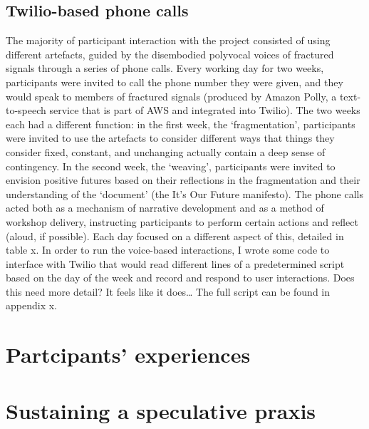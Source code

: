 \subsection{Twilio-based phone calls}
The majority of participant interaction with the project consisted of using different artefacts, guided by the disembodied polyvocal voices of fractured signals through a series of phone calls. Every working day for two weeks, participants were invited to call the phone number they were given, and they would speak to members of fractured signals (produced by Amazon Polly, a text-to-speech service that is part of AWS and integrated into Twilio). The two weeks each had a different function: in the first week, the ‘fragmentation’, participants were invited to use the artefacts to consider different ways that things they consider fixed, constant, and unchanging actually contain a deep sense of contingency. In the second week, the ‘weaving’, participants were invited to envision positive futures based on their reflections in the fragmentation and their understanding of the ‘document’ (the It’s Our Future manifesto). The phone calls acted both as a mechanism of narrative development and as a method of workshop delivery, instructing participants to perform certain actions and reflect (aloud, if possible). Each day focused on a different aspect of this, detailed in table x.  
In order to run the voice-based interactions, I wrote some code to interface with Twilio that would read different lines of a predetermined script based on the day of the week and record and respond to user interactions. Does this need more detail? It feels like it does… The full script can be found in appendix x.

\section{Partcipants' experiences}

\section{Sustaining a speculative praxis}





